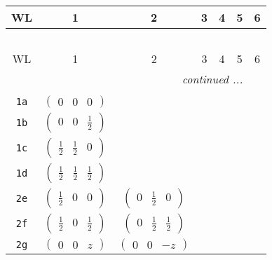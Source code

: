 \documentclass[fleqn,9pt,landscape]{jsarticle}
\begin{document}
\begin{center}
\renewcommand{\arraystretch}{1.2}
\begin{longtable}{ccccccc}
 \hline \hline
WL & 1 & 2 & 3 & 4 & 5 & 6 \\ \hline \endfirsthead

\multicolumn{6}{l}{\tablename\ \thetable{}} \\
 \hline \hline
WL & 1 & 2 & 3 & 4 & 5 & 6 \\ \hline \endhead

 \hline \hline
\multicolumn{6}{r}{\footnotesize\it continued ...} \\ \endfoot

 \hline \hline
\multicolumn{6}{r}{} \\ \endlastfoot

{\tt 1a} & $ \begin{pmatrix} 0 & 0 & 0 \end{pmatrix} $ & $  $ & $  $ & $  $ & $  $ & $  $ \\ \hline
{\tt 1b} & $ \begin{pmatrix} 0 & 0 & \frac{1}{2} \end{pmatrix} $ & $  $ & $  $ & $  $ & $  $ & $  $ \\ \hline
{\tt 1c} & $ \begin{pmatrix} \frac{1}{2} & \frac{1}{2} & 0 \end{pmatrix} $ & $  $ & $  $ & $  $ & $  $ & $  $ \\ \hline
{\tt 1d} & $ \begin{pmatrix} \frac{1}{2} & \frac{1}{2} & \frac{1}{2} \end{pmatrix} $ & $  $ & $  $ & $  $ & $  $ & $  $ \\ \hline
{\tt 2e} & $ \begin{pmatrix} \frac{1}{2} & 0 & 0 \end{pmatrix} $ & $ \begin{pmatrix} 0 & \frac{1}{2} & 0 \end{pmatrix} $ & $  $ & $  $ & $  $ & $  $ \\ \hline
{\tt 2f} & $ \begin{pmatrix} \frac{1}{2} & 0 & \frac{1}{2} \end{pmatrix} $ & $ \begin{pmatrix} 0 & \frac{1}{2} & \frac{1}{2} \end{pmatrix} $ & $  $ & $  $ & $  $ & $  $ \\ \hline
{\tt 2g} & $ \begin{pmatrix} 0 & 0 & z \end{pmatrix} $ & $ \begin{pmatrix} 0 & 0 & - z \end{pmatrix} $ & $  $ & $  $ & $  $ & $  $ \\ \hline

\end{longtable}
\end{center}
\end{document}
